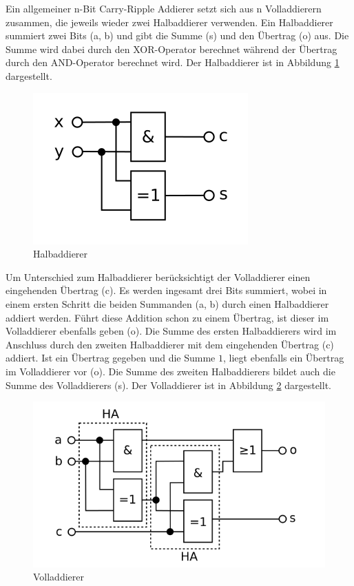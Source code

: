 Ein allgemeiner n-Bit Carry-Ripple Addierer setzt sich aus n Volladdierern zusammen, die jeweils wieder zwei Halbaddierer verwenden. Ein Halbaddierer summiert zwei
Bits (a, b) und gibt die Summe (s) und den Übertrag (o) aus. Die Summe wird dabei durch den XOR-Operator berechnet während der Übertrag durch den AND-Operator
berechnet wird. Der Halbaddierer ist in Abbildung \ref{fig:halfadder} dargestellt.
\begin{figure}[!h]
  \centering
  \includegraphics[scale=1]{images/halfadder}
  \caption[Halbaddierer]{Halbaddierer\protect\footnotemark}
  \label{fig:halfadder}
\end{figure}

Um Unterschied zum Halbaddierer berücksichtigt der Volladdierer einen eingehenden Übertrag (c). Es werden ingesamt drei Bits summiert, wobei in einem ersten Schritt
die beiden Summanden (a, b) durch einen Halbaddierer addiert werden. Führt diese Addition schon zu einem Übertrag, ist dieser im Volladdierer ebenfalls geben (o).
Die Summe des ersten Halbaddierers wird im Anschluss durch den zweiten Halbaddierer mit dem eingehenden Übertrag (c) addiert. Ist ein Übertrag gegeben und die
Summe $1$, liegt ebenfalls ein Übertrag im Volladdierer vor (o). Die Summe des zweiten Halbaddierers bildet auch die Summe des Volladdierers (s). Der Volladdierer
ist in Abbildung \ref{fig:fulladder} dargestellt.
\begin{figure}[!h]
  \centering
  \includegraphics[scale=1]{images/fulladder}
  \caption[Volladdierer]{Volladdierer\protect\footnotemark}
  \label{fig:fulladder}
\end{figure}

